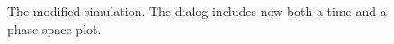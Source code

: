 \begin{figure}[htb]
  \caption{The modified simulation. The dialog includes now both a time and a phase-space plot.}
  \label{fig:02EjsIntro/ModifyRunning}
\end{figure}

